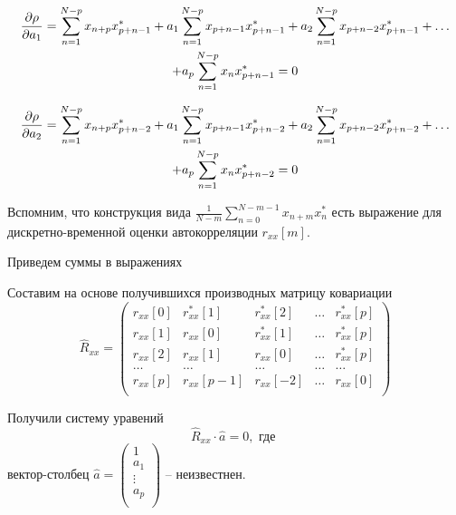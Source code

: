 \documentclass[a4paper,14pt]{extarticle}
\begin{document}
\begin{multline}
    \pdv{\rho}{a_1} = 
        \sum\limits_{n=1}^{N-p} x_{n+p}x^*_{p+n-1}  +
        a_1 \sum\limits_{n=1}^{N-p} x_{p+n-1}x^*_{p+n-1}  +
        a_2\sum\limits_{n=1}^{N-p} x_{p+n-2}x^*_{p+n-1} + \hdots 
        \\
        + a_p\sum\limits_{n=1}^{N-p} x_{n}x^*_{p+n-1} = 0
\end{multline}

\begin{multline}
    \pdv{\rho}{a_2} = 
        \sum\limits_{n=1}^{N-p} x_{n+p}x^*_{p+n-2}  +
        a_1 \sum\limits_{n=1}^{N-p} x_{p+n-1}x^*_{p+n-2}  +
        a_2\sum\limits_{n=1}^{N-p} x_{p+n-2}x^*_{p+n-2} + \hdots  
        \\
        + a_p\sum\limits_{n=1}^{N-p} x_{n}x^*_{p+n-2} = 0
\end{multline}

Вспомним, что конструкция вида $\frac{1}{N-m} \sum\limits_{n=0}^{N-m-1} x_{n+m}
x_n^*$ есть выражение для дискретно-временной оценки автокорреляции
$r_{xx}[m]$.

Приведем суммы в выражениях 

Составим на основе получившихся производных матрицу ковариации
\begin{equation}
    \label{eq:}
    \hat R_{xx} = 
    \begin{pmatrix}
        r_{xx}[0] & r_{xx}^*[1] & r_{xx}^*[2] & \dots & r_{xx}^*[p] \\        
        r_{xx}[1] & r_{xx}[0] & r_{xx}^*[1] & \dots & r_{xx}^*[p] \\        
        r_{xx}[2] & r_{xx}[1] & r_{xx}[0] & \dots & r_{xx}^*[p] \\        
        \dots & \dots & \dots & \dots & \dots \\
        r_{xx}[p] & r_{xx}[p-1] & r_{xx}[-2] & \dots & r_{xx}[0] \\        
    \end{pmatrix}
\end{equation}

Получили систему уравений
\begin{equation}
    \label{eq:solve:a}
    \boxed{
    \hat R_{xx} \cdot \hat a = 0}, \text{ где }
\end{equation}
вектор-столбец  $\hat a=      
    \begin{pmatrix}
        1 \\
        a_1 \\
        \vdots \\
        a_p \\
    \end{pmatrix} $ 
-- неизвестнен.
\end{document}
